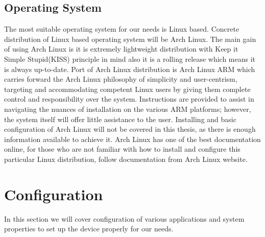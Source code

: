 \subsection{Operating System}
The most suitable operating system for our needs is Linux based. Concrete distribution of Linux based operating system will be Arch Linux. The main gain of using Arch Linux is it is extremely lightweight distribution with Keep it Simple Stupid(KISS) principle in mind also it is a rolling release which means it is always up-to-date. Port of Arch Linux distribution is Arch Linux ARM which carries forward the Arch Linux philosophy of simplicity and user-centrism, targeting and accommodating competent Linux users by giving them complete control and responsibility over the system. Instructions are provided to assist in navigating the nuances of installation on the various ARM platforms; however, the system itself will offer little assistance to the user.
Installing and basic configuration of Arch Linux will not be covered in this thesis, as there is enough information available to achieve it. Arch Linux has one of the best documentation online, for those who are not familiar with how to install and configure this particular Linux distribution, follow documentation from Arch Linux website.

\newpage
\section{Configuration} %
\label{sec:configuration}
In this section we will cover configuration of various applications and system properties to set up the device properly for our needs.
